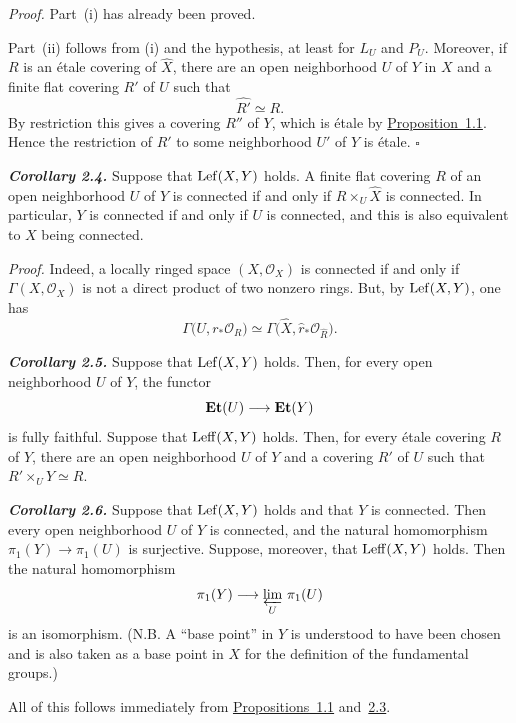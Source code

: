 \medskip
\noindent\textit{Proof.}
Part~(i) has already been proved.

Part~(ii) follows from (i) and the hypothesis, at least for $L_U$ and $P_U$.
Moreover, if $R$ is an \'{e}tale covering of $\widehat X$, there are an open
neighborhood $U$ of $Y$ in $X$ and a finite flat covering $R'$ of $U$ such
that
\[
  \widehat{R'}\simeq R.
\]
By restriction this gives a covering $R''$ of $Y$, which is \'{e}tale by
\hyperref[X.1.1]{Proposition~1.1}. Hence the restriction of $R'$ to some neighborhood $U'$ of
$Y$ is \'{e}tale.
\hfill$\square$

\medskip
{}\noindent\textbf{\textit{Corollary 2.4.}}
Suppose that $\operatorname{Lef}(X,Y)$ holds. A finite flat covering $R$ of an open
neighborhood $U$ of $Y$ is connected if and only if
$R\times_U\widehat X$ is connected. In particular, $Y$ is connected if and
only if $U$ is connected, and this is also equivalent to $X$ being
connected.

\medskip
\noindent\textit{Proof.}
Indeed, a locally ringed space $(X,\mathcal O_X)$ is connected if and only if
$\Gamma(X,\mathcal O_X)$ is not a direct product of two nonzero rings. But,
by $\operatorname{Lef}(X,Y)$, one has
\[
  \Gamma\bigl(U,r_*\mathcal O_R\bigr)
  \simeq
  \Gamma\bigl(\widehat X,\widehat r_*\mathcal O_{\widehat R}\bigr).
\]

\medskip
{}\noindent\textbf{\textit{Corollary 2.5.}}
Suppose that $\operatorname{Lef}(X,Y)$ holds. Then, for every open neighborhood $U$ of
$Y$, the functor
\[
  \mathbf{Et}(U)\longrightarrow\mathbf{Et}(Y)
\]
is fully faithful. Suppose that $\operatorname{Leff}(X,Y)$ holds. Then, for every
\'{e}tale covering $R$ of $Y$, there are an open neighborhood $U$ of $Y$
and a covering $R'$ of $U$ such that
$R'\times_U Y\simeq R$.

\medskip
{}\noindent\textbf{\textit{Corollary 2.6.}}
Suppose that $\operatorname{Lef}(X,Y)$ holds and that $Y$ is connected. Then every open
neighborhood $U$ of $Y$ is connected, and the natural homomorphism
$\pi_1(Y)\longrightarrow\pi_1(U)$ is surjective. Suppose, moreover, that
$\operatorname{Leff}(X,Y)$ holds. Then the natural homomorphism
\[
  \pi_1(Y)\longrightarrow\varprojlim_{U}\,\pi_1(U)
\]
is an isomorphism. (N.B. A ``base point'' in $Y$ is understood to have been
chosen and is also taken as a base point in $X$ for the definition of the
fundamental groups.)

\medskip
\noindent All of this follows immediately from \hyperref[X.1.1]{Propositions~1.1} and~\hyperref[X.2.3]{2.3}.

